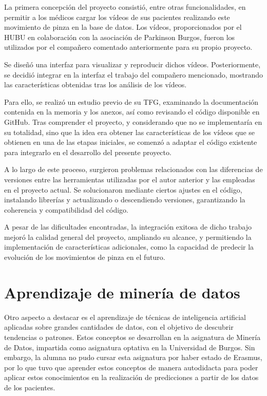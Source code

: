 La primera concepción del proyecto consistió, entre otras funcionalidades, en permitir a los médicos cargar los vídeos de sus pacientes realizando este movimiento de pinza en la base de datos. Los vídeos, proporcionados por el HUBU en colaboración con la asociación de Parkinson Burgos, fueron los utilizados por el compañero comentado anteriormente para su propio proyecto.

Se diseñó una interfaz para visualizar y reproducir dichos vídeos. Posteriormente, se decidió integrar en la interfaz el trabajo del compañero mencionado, mostrando las características obtenidas tras los análisis de los vídeos.

Para ello, se realizó un estudio previo de su TFG, examinando la documentación contenida en la memoria y los anexos, así como revisando el código disponible en GitHub. Tras comprender el proyecto, y considerando que no se implementaría en su totalidad, sino que la idea era obtener las características de los vídeos que se obtienen en una de las etapas iniciales, se comenzó a adaptar el código existente para integrarlo en el desarrollo del presente proyecto.

A lo largo de este proceso, surgieron problemas relacionados con las diferencias de versiones entre las herramientas utilizadas por el autor anterior y las empleadas en el proyecto actual. Se solucionaron mediante ciertos ajustes en el código, instalando librerías y actualizando o descendiendo versiones, garantizando la coherencia y compatibilidad del código.

A pesar de las dificultades encontradas, la integración exitosa de dicho trabajo mejoró la calidad general del proyecto, ampliando su alcance, y permitiendo la implementación de características adicionales, como la capacidad de predecir la evolución de los movimientos de pinza en el futuro.



\section{Aprendizaje de minería de datos}
Otro aspecto a destacar es el aprendizaje de técnicas de inteligencia artificial aplicadas sobre grandes cantidades de datos, con el objetivo de descubrir tendencias o patrones. Estos conceptos se desarrollan en la asignatura de Minería de Datos, impartida como asignatura optativa en la Universidad de Burgos. Sin embargo, la alumna no pudo cursar esta asignatura por haber estado de Erasmus, por lo que tuvo que aprender estos conceptos de manera autodidacta para poder aplicar estos conocimientos en la realización de predicciones a partir de los datos de los pacientes.

